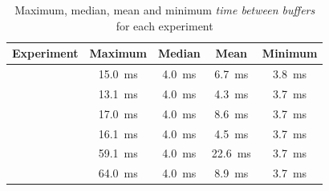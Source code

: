 \begin{table}[h]
    \centering
    \renewcommand{\arraystretch}{1.1}
    \begin{tabularx}{\textwidth}{|>{\raggedleft\arraybackslash}X||c|c|c|c|}
        \hline
        \textbf{Experiment} & \textbf{Maximum} & \textbf{Median} & \textbf{Mean} & \textbf{Minimum} \\
        \hline

        \nameref{evaluation/results/trace-no-delay} &
        \SI{15.0}{\milli\second} &
        \SI{4.0}{\milli\second} &
        \SI{6.7}{\milli\second} &
        \SI{3.8}{\milli\second}
        \\
        \hline

        \nameref{evaluation/results/trace-100us-delay} &
        \SI{13.1}{\milli\second} &
        \SI{4.0}{\milli\second} &
        \SI{4.3}{\milli\second} &
        \SI{3.7}{\milli\second}
        \\
        \hline

        \nameref{evaluation/results/synthetic-read-write-instructions-no-delay} &
        \SI{17.0}{\milli\second} &
        \SI{4.0}{\milli\second} &
        \SI{8.6}{\milli\second} &
        \SI{3.7}{\milli\second}
        \\
        \hline

        \nameref{evaluation/results/synthetic-read-write-instructions-100us-delay} &
        \SI{16.1}{\milli\second} &
        \SI{4.0}{\milli\second} &
        \SI{4.5}{\milli\second} &
        \SI{3.7}{\milli\second}
        \\
        \hline

        \nameref{evaluation/results/synthetic-ping-instructions-no-delay} &
        \SI{59.1}{\milli\second} &
        \SI{4.0}{\milli\second} &
        \SI{22.6}{\milli\second} &
        \SI{3.7}{\milli\second}
        \\
        \hline

        \nameref{evaluation/results/synthetic-ping-instructions-100us-delay} &
        \SI{64.0}{\milli\second} &
        \SI{4.0}{\milli\second} &
        \SI{8.9}{\milli\second} &
        \SI{3.7}{\milli\second}
        \\
        \hline
    \end{tabularx}
    \caption{Maximum, median, mean and minimum \textit{time between buffers} for each experiment}
\end{table}

